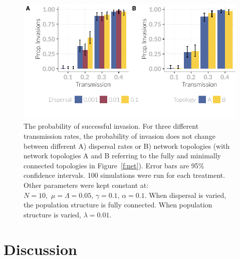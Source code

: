 \begin{knitrout}\footnotesize
{}\color{fgcolor}\begin{figure}[t]

{\centering \includegraphics[width=\textwidth]{figure/invasionPropPlots-1} 

}

\caption[The probability of invasion across different dispersal rates and network topologies.]{The probability of successful invasion. 
  For three different transmission rates, the probability of invasion does not change between different A) dispersal rates or B) network topologies (with network topologies A and B referring to the fully and minimally connected topologies in Figure~\ref{f:net}). 
  Error bars are 95\% confidence intervals. 
  100 simulations were run for each treatment.
  Other parameters were kept constant at: $N = 10,\, \, \mu = \Lambda = 0.05,\, \gamma = 0.1,\, \alpha = 0.1$. 
  When dispersal is varied, the population structure is fully connected. When population structure is varied, $\lambda = 0.01$.}\label{f:invasionPropPlots}
\end{figure}


\end{knitrout}






\section{Discussion}\label{s:sims1Disc}


